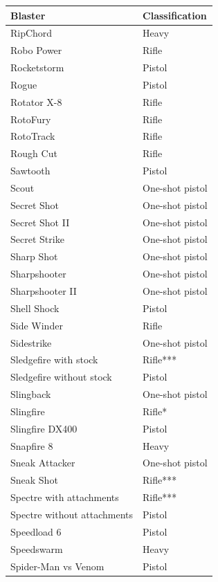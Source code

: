 \begin{table}
\begin{tabular}{|l|l|} \hline 
Blaster & Classification \\
 \hline RipChord & Heavy \\
 \hline Robo Power & Rifle \\
 \hline Rocketstorm & Pistol \\
 \hline Rogue & Pistol \\
 \hline Rotator X-8 & Rifle \\
 \hline RotoFury & Rifle \\
 \hline RotoTrack & Rifle \\
 \hline Rough Cut & Rifle \\
 \hline Sawtooth & Pistol \\
 \hline Scout & One-shot pistol \\
 \hline Secret Shot & One-shot pistol \\
 \hline Secret Shot II & One-shot pistol \\
 \hline Secret Strike & One-shot pistol \\
 \hline Sharp Shot & One-shot pistol \\
 \hline Sharpshooter & One-shot pistol \\
 \hline Sharpshooter II & One-shot pistol \\
 \hline Shell Shock & Pistol \\
 \hline Side Winder & Rifle \\
 \hline Sidestrike & One-shot pistol \\
 \hline Sledgefire with stock & Rifle*** \\
 \hline Sledgefire without stock & Pistol \\
 \hline Slingback & One-shot pistol \\
 \hline Slingfire & Rifle* \\
 \hline Slingfire DX400 & Pistol \\
 \hline Snapfire 8 & Heavy \\
 \hline Sneak Attacker & One-shot pistol \\
 \hline Sneak Shot & Rifle*** \\
 \hline Spectre with attachments & Rifle*** \\
 \hline Spectre without attachments & Pistol \\
 \hline Speedload 6 & Pistol \\
 \hline Speedswarm & Heavy \\
 \hline Spider-Man vs Venom & Pistol \\

\end{tabular}
\end{table}
